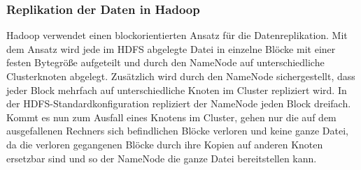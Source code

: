 \subsubsection{Replikation der Daten in Hadoop}
Hadoop verwendet einen blockorientierten Ansatz für die Datenreplikation. Mit dem Ansatz wird jede im HDFS abgelegte Datei in einzelne Blöcke mit einer festen Bytegröße aufgeteilt und durch den NameNode auf unterschiedliche Clusterknoten abgelegt. Zusätzlich wird durch den NameNode sichergestellt, dass jeder Block mehrfach auf unterschiedliche Knoten im Cluster repliziert wird.
In der HDFS-Standardkonfiguration repliziert der NameNode jeden Block dreifach. Kommt es nun zum Ausfall eines Knotens im Cluster, gehen nur die auf dem ausgefallenen Rechners sich befindlichen Blöcke verloren und keine ganze Datei, da die verloren gegangenen Blöcke durch ihre Kopien auf anderen Knoten ersetzbar sind und so der NameNode die ganze Datei bereitstellen kann.
\cite{replikation}
